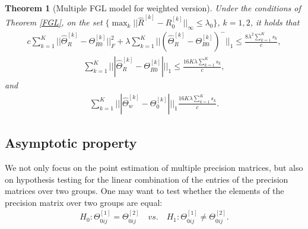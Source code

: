 \documentclass[review]{elsarticle}
\newcommand{\1}{{\bf 1}}
\newcommand{\0}{{\bf 0}}
\newcommand{\bqa}{\begin{eqnarray}}
\newcommand{\eqa}{\end{eqnarray}}
\newtheorem{thm}{Theorem}
\begin{document}
\begin{thm}[Multiple FGL model for weighted version]\label{FGLwei}
 Under the conditions of Theorem \ref{FGL}, on the set $\{\max_{k}||\widehat{R}^{[k]}-R_{0}^{[k]}||_{\infty}\leq\lambda_0\}$, $k=1,2$, it holds that
\begin{equation}
\begin{split}
 c\sum_{k=1}^{K}||\widehat{\Theta}_R^{[k]}-\Theta_{R0}^{[k]}||_{F}^{2}
 +\lambda\sum_{k=1}^{K}||(\widehat{\Theta}_R^{[k]}-\Theta_{R0}^{[k]})^{-}||_1
\leq
\frac{8\lambda^2\sum_{k=1}^{K}s_k}{c},
\end{split}
\end{equation}
\begin{equation}
\begin{split}
\sum_{k=1}^{K}|||\widehat{\Theta}_R^{[k]}-\Theta_{R0}^{[k]}|||_{1}
\leq
\frac{16K\lambda\sum_{k=1}^{K}s_k}{c},
\end{split}
\end{equation}
 and
\begin{equation}
\begin{split}
\sum_{k=1}^{K}|||\widehat{\Theta}_w^{[k]}-\Theta_{0}^{[k]}|||_1
\frac{16K\lambda\sum_{k=1}^{K}s_k}{c}.
\end{split}
\end{equation}
\end{thm}

\subsection{Asymptotic property}

 We not only focus on the point estimation of multiple precision matrices, but also on hypothesis testing for the linear combination of the entries of the precision matrices over two groups.
 One may want to test whether the elements of the precision matrix over two groups are equal:
\bqa\label{hy1}
H_0: \Theta^{[1]}_{0ij}=\Theta^{[2]}_{0ij} \quad vs. \quad H_1: \Theta^{[1]}_{0ij}\neq \Theta^{[2]}_{0ij}.
\eqa
\end{document}
